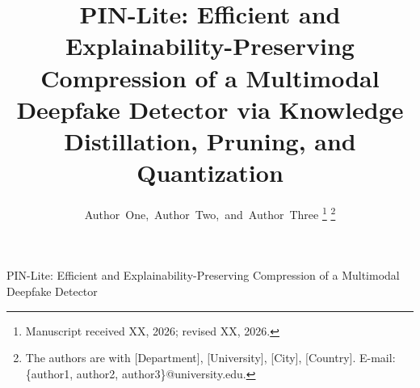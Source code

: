 \documentclass[lettersize,journal]{IEEEtran}
\begin{document}
\title{PIN-Lite: Efficient and Explainability-Preserving Compression of a Multimodal Deepfake Detector via Knowledge Distillation, Pruning, and Quantization}

\author{Author~One,~Author~Two,~and~Author~Three
\thanks{Manuscript received XX, 2026; revised XX, 2026.}
\thanks{The authors are with [Department], [University], [City], [Country]. E-mail: \{author1, author2, author3\}@university.edu.}}

%
{PIN-Lite: Efficient and Explainability-Preserving Compression of a Multimodal Deepfake Detector}

\maketitle
\end{document}
